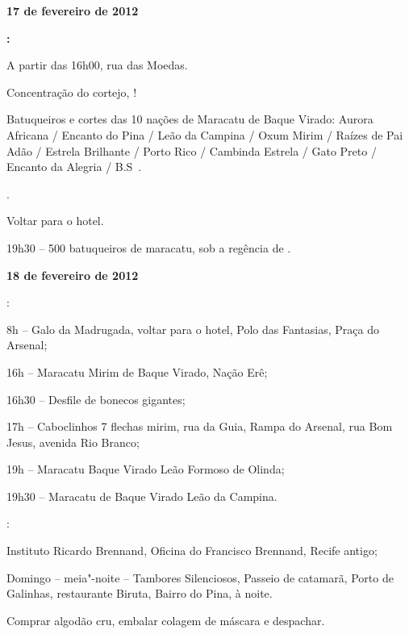 \begin{center}\asterisc{}\end{center}

\begin{flushright}\textbf{17 de fevereiro de 2012}\end{flushright}


\textbf{:}

A partir das 16h00, rua das Moedas.

Concentração do cortejo,  !

Batuqueiros e cortes das 10 nações de Maracatu de Baque Virado: Aurora
Africana / Encanto do Pina / Leão da Campina / Oxum Mirim / Raízes de
Pai Adão / Estrela Brilhante / Porto Rico / Cambinda Estrela / Gato
Preto / Encanto da Alegria /  B.S\,  .

  .

Voltar para o hotel.

19h30 -- 500 batuqueiros de maracatu, sob a regência de 
.

\begin{flushright}\textbf{18 de fevereiro de 2012}\end{flushright}


:

8h -- Galo da Madrugada, voltar para o hotel, Polo das Fantasias, Praça
do Arsenal;

16h -- Maracatu Mirim de Baque Virado, Nação Erê;

16h30 -- Desfile de bonecos gigantes;

17h -- Caboclinhos 7 flechas mirim, rua da Guia, Rampa do Arsenal, rua
Bom Jesus, avenida Rio Branco;

19h -- Maracatu Baque Virado Leão Formoso de Olinda;

19h30 -- Maracatu de Baque Virado Leão da Campina.

:

Instituto Ricardo Brennand, Oficina do Francisco Brennand, Recife
antigo;

Domingo -- meia"-noite -- Tambores Silenciosos, Passeio de catamarã,
Porto de Galinhas, restaurante Biruta, Bairro do Pina, à noite.

Comprar algodão cru, embalar colagem de máscara e despachar.

\begin{flushright}\textbf{}\end{flushright}

